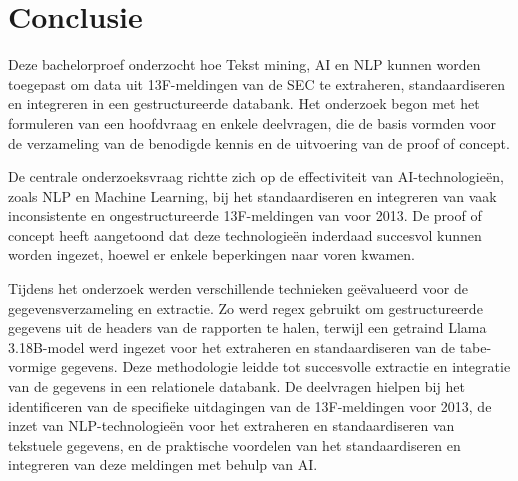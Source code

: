 
\chapter{Conclusie}%
\label{ch:conclusie}




Deze bachelorproef onderzocht hoe Tekst mining, AI en NLP kunnen worden toegepast om data uit 13F-meldingen van de SEC te extraheren, standaardiseren en integreren in een gestructureerde databank. Het onderzoek begon met het formuleren van een hoofdvraag en enkele deelvragen, die de basis vormden voor de verzameling van de benodigde kennis en de uitvoering van de proof of concept.

De centrale onderzoeksvraag richtte zich op de effectiviteit van AI-technologieën, zoals NLP en Machine Learning, bij het standaardiseren en integreren van vaak inconsistente en ongestructureerde 13F-meldingen van voor 2013. De proof of concept heeft aangetoond dat deze technologieën inderdaad succesvol kunnen worden ingezet, hoewel er enkele beperkingen naar voren kwamen.

Tijdens het onderzoek werden verschillende technieken geëvalueerd voor de gegevensverzameling en extractie. Zo werd regex gebruikt om gestructureerde gegevens uit de headers van de rapporten te halen, terwijl een getraind Llama 3.18B-model werd ingezet voor het extraheren en standaardiseren van de tabe-vormige gegevens. Deze methodologie leidde tot succesvolle extractie en integratie van de gegevens in een relationele databank. De deelvragen hielpen bij het identificeren van de specifieke uitdagingen van de 13F-meldingen voor 2013, de inzet van NLP-technologieën voor het extraheren en standaardiseren van tekstuele gegevens, en de praktische voordelen van het standaardiseren en integreren van deze meldingen met behulp van AI.

